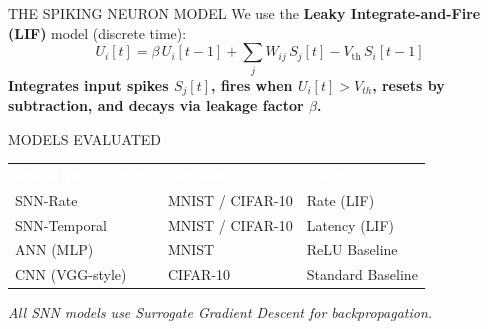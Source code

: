 \documentclass[final]{beamer}
\newlength{\coltwo}
\begin{document}
\begin{frame}[t]
\begin{columns}[t]
\begin{column}{\coltwo}

  \begin{block}{THE SPIKING NEURON MODEL}
    \small
    We use the \textbf{Leaky Integrate-and-Fire (LIF)} model (discrete time):
    \[
      U_i[t] = \beta\, U_i[t-1] + \sum_j W_{ij}\, S_j[t] - V_{\text{th}}\, S_i[t-1]
    \]
    \textbf{Integrates input spikes $S_j[t]$, fires when $U_i[t] > V_{th}$,
    resets by subtraction, and decays via leakage factor $\beta$.}
    
  \end{block}

  \begin{block}{MODELS EVALUATED}
    \centering
    \vspace{0.5ex}
    \renewcommand{\arraystretch}{1.6}
    \setlength{\tabcolsep}{10pt}
    \begin{tabularx}{\columnwidth}{>{\raggedright\arraybackslash}X
                                   >{\centering\arraybackslash}X
                                   >{\raggedleft\arraybackslash}X}
      \rowcolor{iitgnblue}
      \textbf{\textcolor{white}{Model Architecture}} &
      \textbf{\textcolor{white}{Dataset}} &
      \textbf{\textcolor{white}{Coding}} \\
      SNN-Rate       & MNIST / CIFAR-10 & Rate (LIF) \\
      \rowcolor{deepiitblue}
      SNN-Temporal   & MNIST / CIFAR-10 & Latency (LIF) \\
      ANN (MLP)      & MNIST            & ReLU Baseline \\
      \rowcolor{deepiitblue}
      CNN (VGG-style) & CIFAR-10        & Standard Baseline \\
    \end{tabularx}

    \vspace{0.6ex}
    \small\textit{All SNN models use Surrogate Gradient Descent for backpropagation.}
    \vspace{1.2ex}


\end{block}
\end{column}
\end{columns}
\end{frame}
\end{document}
